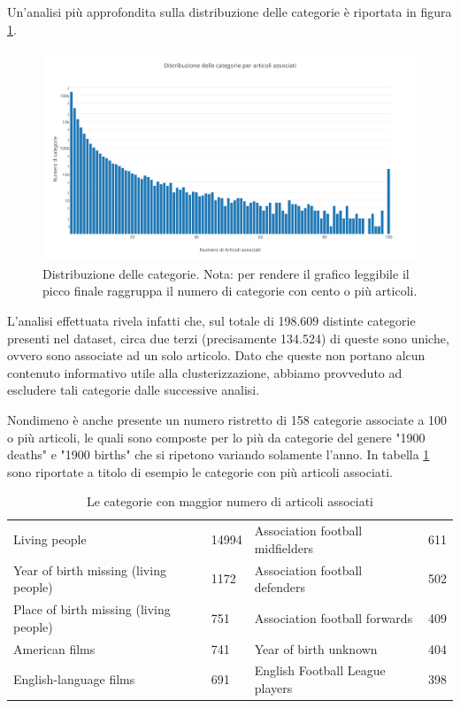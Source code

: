 \documentclass[
	11pt, %
	a4paper, %
	oneside, %
	headinclude,footinclude, %
	BCOR5mm, %
]{scrartcl}
\begin{document}
    Un'analisi più approfondita sulla distribuzione delle categorie è riportata in figura \ref{fig:categories}.
    \begin{figure}[!htb]
			\centering
			\includegraphics[scale=.5]{Figures/categories.png}
			\caption{Distribuzione delle categorie. Nota: per rendere il grafico leggibile il picco finale raggruppa il numero di categorie con cento o più articoli.}
			\label{fig:categories}
		\end{figure}

	L'analisi effettuata rivela infatti che, sul totale di 198.609 distinte categorie presenti nel dataset, circa due terzi (precisamente 134.524) di queste sono uniche, ovvero sono associate ad un solo articolo.
	Dato che queste non portano alcun contenuto informativo utile alla clusterizzazione, abbiamo provveduto ad escludere tali categorie dalle successive analisi.

	Nondimeno è anche presente un numero ristretto di 158 categorie associate a 100 o più articoli, le quali sono composte per lo più da categorie del genere "1900 deaths" e "1900 births" che si ripetono variando solamente l'anno.
	In tabella \ref{table:toptencategories} sono riportate a titolo di esempio le categorie con più articoli associati.


	\begin{table}[]
	\begin{tabular}{l|l||l|l}
	Living people & 14994 & Association football midfielders & 611 \\
	Year of birth missing (living people) & 1172 & Association football defenders & 502 \\
	Place of birth missing (living people) & 751 & Association football forwards & 409 \\
	American films & 741 & Year of birth unknown & 404 \\
	English-language films & 691 & English Football League players & 398 \\
	\end{tabular}
	\caption{Le categorie con maggior numero di articoli associati}
	\label{table:toptencategories}
	\end{table}
\end{document}
